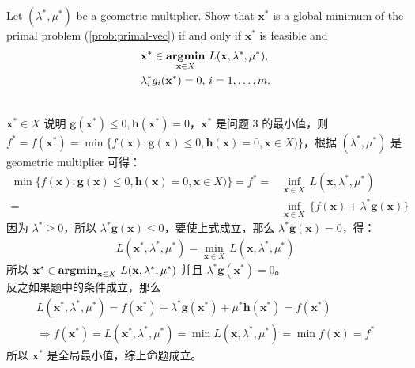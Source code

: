 \documentclass[11pt,letter,notitlepage]{article}
\DeclareMathOperator*{\argmin}{\bf argmin}
\begin{document}
\newpage
\begin{exercise}
Let $(\lambda^*,\mu^*)$ be a geometric multiplier. Show that $\mathbf{x}^*$ is a global minimum of the primal problem (\ref{prob:primal-vec}) if and only if $\mathbf{x}^*$ is feasible and 
\begin{align*}
	&\mathbf{x}^*\in\argmin_{\mathbf{x}\in X}\,L(\mathbf{x},\lambda^*,\mu^*),\\
	&\lambda_i^*g_i(\mathbf{x}^*)=0,\,i=1,\ldots,m.
\end{align*}
\end{exercise}

\begin{solution}
	\heiti
	\ \\
	$\mathbf{x}^* \in X$ 说明 $\mathbf{g}(\mathbf{x^*}) \leqslant 0, \mathbf{h}(\mathbf{x^*}) = 0$，$\mathbf{x}^*$ 是问题 3 的最小值，则 $f^* = f(\mathbf{x}^*) = \min\{f(\mathbf{x}):\mathbf{g}(\mathbf{x})\leq0,\mathbf{h}(\mathbf{x})=0,\mathbf{x}\in X)\}$，根据 $(\lambda^*,\mu^*)$ 是 geometric multiplier 可得：
	\begin{align*}
		\min\{f(\mathbf{x}):\mathbf{g}(\mathbf{x})\leq0,\mathbf{h}(\mathbf{x})=0,\mathbf{x}\in X)\} = f^* = & \inf_{\mathbf{x}\in X}\,L(\mathbf{x},\lambda^*,\mu^*)\\
		= & \inf_{\mathbf{x}\in X}\,\{f(\mathbf{x})+\lambda^* \mathbf{g}(\mathbf{x})\}
	\end{align*}
	因为 $\lambda^* \geqslant 0$，所以 $\lambda^* \mathbf{g}(\mathbf{x}) \leqslant 0$，要使上式成立，那么 $\lambda^* \mathbf{g}(\mathbf{x}) = 0$，得：
	\begin{align*}
		L(\mathbf{x}^*,\lambda^*,\mu^*) = \min_{\mathbf{x}\in X}\,L(\mathbf{x},\lambda^*,\mu^*)
	\end{align*}
	所以 $\mathbf{x}^*\in\argmin_{\mathbf{x}\in X}\,L(\mathbf{x},\lambda^*,\mu^*)$ 并且 $\lambda^* \mathbf{g}(\mathbf{x}^*) = 0$。\\
	反之如果题中的条件成立，那么
	\begin{align*}
		L(\mathbf{x}^*,\lambda^*,\mu^*) = f(\mathbf{x}^*) + \lambda^*\mathbf{g}(\mathbf{x}^*) + \mu^*\mathbf{h}(\mathbf{x}^*) = f(\mathbf{x}^*)\\
		\Rightarrow f(\mathbf{x}^*) = L(\mathbf{x}^*,\lambda^*,\mu^*) = \min L(\mathbf{x},\lambda^*,\mu^*) = \min f(\mathbf{x}) = f^*
	\end{align*}
	所以 $\mathbf{x}^*$ 是全局最小值，综上命题成立。
\end{solution}
\end{document}
